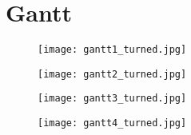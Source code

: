 \section{Gantt} 
\label{sec:PlanungGantt} 
\begin{landscape}
	\begin{figure}[htbp]
		\centering
		\texttt{[image: gantt1\_turned.jpg]}
		\label{fig:gantt1}
	\end{figure}

	\begin{figure}[htbp]
		\centering
		\texttt{[image: gantt2\_turned.jpg]}
		\label{fig:gantt2}
	\end{figure}

	\begin{figure}[htbp]
		\centering
		\texttt{[image: gantt3\_turned.jpg]}
		\label{fig:gantt3}
	\end{figure}

	\begin{figure}[htbp]
		\centering
		\texttt{[image: gantt4\_turned.jpg]}
		\label{fig:gantt4}
	\end{figure}

\end{landscape}



